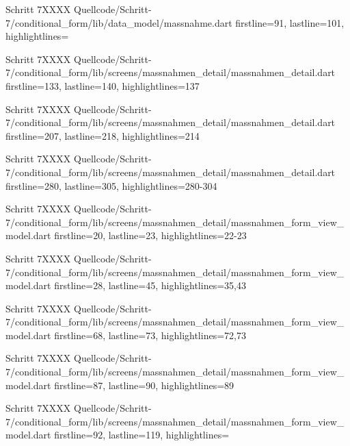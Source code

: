   \begin{alexlistingzwei}{Schritt 7}{XXXX}
    {Quellcode/Schritt-7/conditional_form/lib/data_model/massnahme.dart}
    {firstline=91, lastline=101, highlightlines={}}
    \label{lst:Schritt5XXXX}
  \end{alexlistingzwei}

  \begin{alexlistingzwei}{Schritt 7}{XXXX}
    {Quellcode/Schritt-7/conditional_form/lib/screens/massnahmen_detail/massnahmen_detail.dart}
    {firstline=133, lastline=140, highlightlines={137}}
    \label{lst:Schritt6XXXXX}
  \end{alexlistingzwei}

  \begin{alexlistingzwei}{Schritt 7}{XXXX}
    {Quellcode/Schritt-7/conditional_form/lib/screens/massnahmen_detail/massnahmen_detail.dart}
    {firstline=207, lastline=218, highlightlines={214}}
    \label{lst:Schritt6XXXXX}
  \end{alexlistingzwei}

  \begin{alexlistingzwei}{Schritt 7}{XXXX}
    {Quellcode/Schritt-7/conditional_form/lib/screens/massnahmen_detail/massnahmen_detail.dart}
    {firstline=280, lastline=305, highlightlines={280-304}}
    \label{lst:Schritt6XXXXX}
  \end{alexlistingzwei}



  \begin{alexlistingzwei}{Schritt 7}{XXXX}
    {Quellcode/Schritt-7/conditional_form/lib/screens/massnahmen_detail/massnahmen_form_view_model.dart}
    {firstline=20, lastline=23, highlightlines={22-23}}
    \label{lst:Schritt5XXXXX}
  \end{alexlistingzwei}
  \begin{alexlistingzwei}{Schritt 7}{XXXX}
    {Quellcode/Schritt-7/conditional_form/lib/screens/massnahmen_detail/massnahmen_form_view_model.dart}
    {firstline=28, lastline=45, highlightlines={35,43}}
    \label{lst:Schritt5XXXXX}
  \end{alexlistingzwei}
  \begin{alexlistingzwei}{Schritt 7}{XXXX}
    {Quellcode/Schritt-7/conditional_form/lib/screens/massnahmen_detail/massnahmen_form_view_model.dart}
    {firstline=68, lastline=73, highlightlines={72,73}}
    \label{lst:Schritt5XXXXX}
  \end{alexlistingzwei}
  \begin{alexlistingzwei}{Schritt 7}{XXXX}
    {Quellcode/Schritt-7/conditional_form/lib/screens/massnahmen_detail/massnahmen_form_view_model.dart}
    {firstline=87, lastline=90, highlightlines={89}}
    \label{lst:Schritt5XXXXX}
  \end{alexlistingzwei}
  \begin{alexlistingzwei}{Schritt 7}{XXXX}
    {Quellcode/Schritt-7/conditional_form/lib/screens/massnahmen_detail/massnahmen_form_view_model.dart}
    {firstline=92, lastline=119, highlightlines={}}
    \label{lst:Schritt5XXXXX}
  \end{alexlistingzwei}

